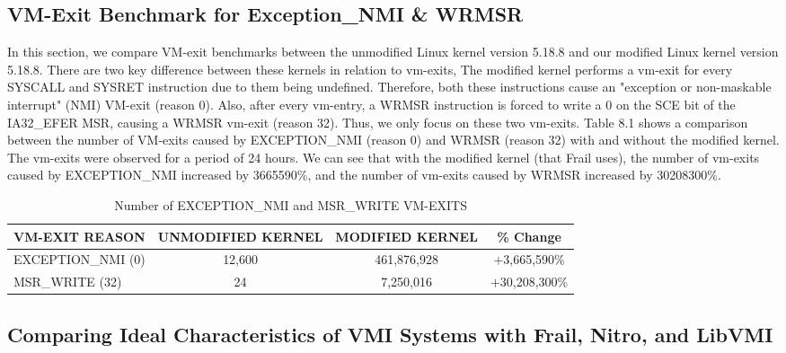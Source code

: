 \documentclass{report}
\begin{document}
\begin{spacing}{1.5}
\section{VM-Exit Benchmark for Exception\_NMI \& WRMSR}


{\large
In this section, we compare VM-exit benchmarks between the unmodified Linux kernel version 5.18.8 and our modified Linux kernel version 5.18.8. There are two key difference between these kernels in relation to vm-exits, The modified kernel performs a vm-exit for every SYSCALL and SYSRET instruction due to them being undefined. Therefore, both these instructions cause an "exception or non-maskable interrupt" (NMI) VM-exit (reason 0). Also, after every vm-entry, a WRMSR instruction is forced to write a 0 on the SCE bit of the IA32\_EFER MSR, causing a WRMSR vm-exit (reason 32). Thus, we only focus on these two vm-exits. Table 8.1 shows a comparison between the number of VM-exits caused by EXCEPTION\_NMI (reason 0) and WRMSR (reason 32) with and without the modified kernel. The vm-exits were observed for a period of 24 hours. We can see that with the modified kernel (that Frail uses), the number of vm-exits caused by EXCEPTION\_NMI increased by 3665590\%, and the number of vm-exits caused by WRMSR increased by 30208300\%.
\newline
}


\begin{table}[ht]
\centering
\caption{Number of EXCEPTION\_NMI and MSR\_WRITE VM-EXITS}
\begin{tabular}[t]{lccc}
\hline
VM-EXIT REASON&UNMODIFIED KERNEL&MODIFIED KERNEL&\% Change\\
\hline
EXCEPTION\_NMI (0) &12,600&461,876,928&$+$3,665,590\%\\
MSR\_WRITE (32) & 24 & 7,250,016&$+$30,208,300\%\\
\hline
\end{tabular}
\end{table}%





\subsection{Comparing Ideal Characteristics of VMI Systems with Frail, Nitro, and LibVMI}

{\large

\leavevmode\newline
}



\end{spacing}
\end{document}
